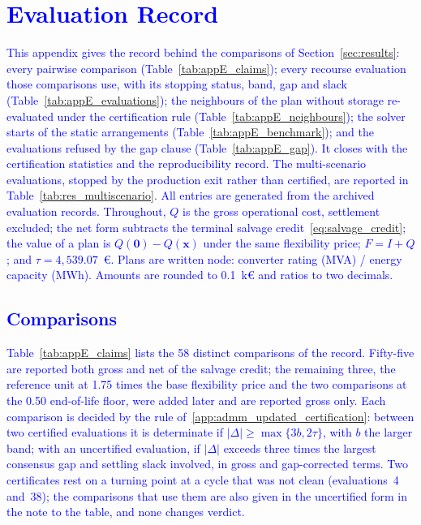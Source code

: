 \documentclass[preprint,12pt]{elsarticle}
\begin{document}
\section{\textcolor{blue}{Evaluation Record}}
\label{app:results}

\textcolor{blue}{
    This appendix gives the record behind the comparisons of Section~\ref{sec:results}: every pairwise comparison (Table~\ref{tab:appE_claims}); every recourse evaluation those comparisons use, with its stopping status, band, gap and slack (Table~\ref{tab:appE_evaluations}); the neighbours of the plan without storage re-evaluated under the certification rule (Table~\ref{tab:appE_neighbours}); the solver starts of the static arrangements (Table~\ref{tab:appE_benchmark}); and the evaluations refused by the gap clause (Table~\ref{tab:appE_gap}). It closes with the certification statistics and the reproducibility record. The multi-scenario evaluations, stopped by the production exit rather than certified, are reported in Table~\ref{tab:res_multiscenario}. All entries are generated from the archived evaluation records. Throughout, $Q$ is the gross operational cost, settlement excluded; the net form subtracts the terminal salvage credit~\eqref{eq:salvage_credit}; the value of a plan is $Q(\boldsymbol{0}) - Q(\boldsymbol{x})$ under the same flexibility price; $F = I + Q$; and $\tau = 4{,}539.07$~\euro{}. Plans are written node: converter rating (MVA) / energy capacity (MWh). Amounts are rounded to 0.1~k\euro{} and ratios to two decimals.
}

\subsection{\textcolor{blue}{Comparisons}}
\label{app:results_claims}

\textcolor{blue}{
    Table~\ref{tab:appE_claims} lists the 58 distinct comparisons of the record. Fifty-five are reported both gross and net of the salvage credit; the remaining three, the reference unit at 1.75 times the base flexibility price and the two comparisons at the 0.50 end-of-life floor, were added later and are reported gross only. Each comparison is decided by the rule of~\ref{app:admm_updated_certification}: between two certified evaluations it is determinate if $|\Delta| \geq \max\{3b, 2\tau\}$, with $b$ the larger band; with an uncertified evaluation, if $|\Delta|$ exceeds three times the largest consensus gap and settling slack involved, in gross and gap-corrected terms. Two certificates rest on a turning point at a cycle that was not clean (evaluations~4 and~38); the comparisons that use them are also given in the uncertified form in the note to the table, and none changes verdict.
}
\end{document}
